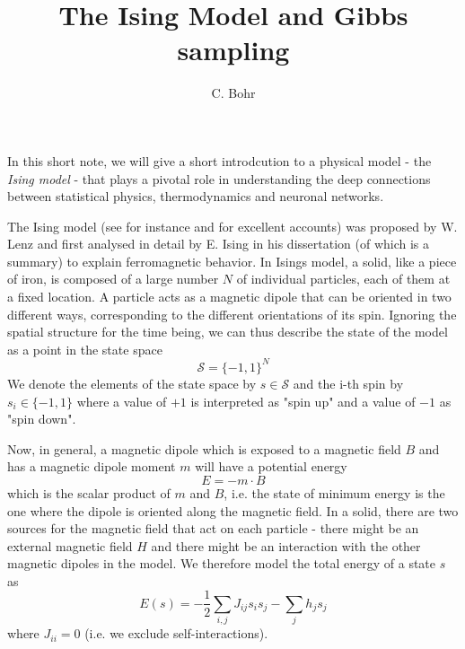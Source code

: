 \documentclass[a4paper, draft]{article}
\author{C. Bohr}
\title{The Ising Model and Gibbs sampling}
\theoremstyle{own}
\theoremstyle{remark}
\begin{document}
\maketitle







In this short note, we will give a short introdcution to a physical model - the {\em Ising model} - that plays a pivotal role in understanding the deep connections between statistical physics, thermodynamics and neuronal networks.

The Ising model (see for instance \cite{Schroeder} and \cite{MacKay} for excellent accounts) was proposed by W. Lenz and first analysed in detail by E. Ising in his dissertation (of which \cite{Ising1924} is a summary) to explain ferromagnetic behavior. In Isings model, a solid, like a piece of iron, is composed of a large number $N$ of individual particles, each of them at a fixed location. A particle acts as a magnetic dipole that can be oriented in two different ways, corresponding to the different orientations of its spin. Ignoring the spatial structure for the time being, we can thus describe the state of the model as a point in the state space
$$
{\mathcal S} = \{ -1, 1\}^N
$$
We denote the elements of the state space by $s \in {\mathcal S}$ and the i-th spin by $s_i \in \{-1,1\}$ where a value of $+1$ is interpreted as "spin up" and a value of $-1$ as "spin down". 

Now, in general, a magnetic dipole which is exposed to a magnetic field $B$ and has a magnetic dipole moment $m$ will have a potential energy
$$
E = - m \cdot B
$$
which is the scalar product of $m$ and $B$, i.e. the state of minimum energy is the one where the dipole is oriented along the magnetic field. In a solid, there are two sources for the magnetic field that act on each particle - there might be an external magnetic field $H$ and there might be an interaction with the other magnetic dipoles in the model. We therefore model the total energy of a state $s$ as
$$
E(s) = - \frac{1}{2} \sum_{i,j} J_{ij} s_i s_j - \sum_j h_j s_j
$$
where $J_{ii} = 0$ (i.e. we exclude self-interactions).
\end{document}
